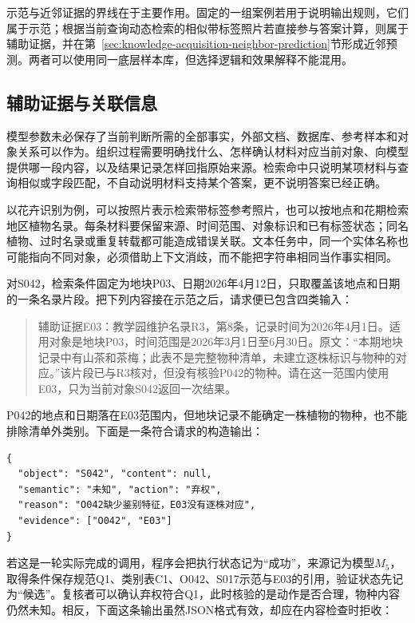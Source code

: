 示范与近邻证据的界线在于主要作用。固定的一组案例若用于说明输出规则，它们属于示范；根据当前查询动态检索的相似带标签照片若直接参与答案计算，则属于辅助证据，并在第~\ref{sec:knowledge-acquisition-neighbor-prediction}节形成近邻预测。两者可以使用同一底层样本库，但选择逻辑和效果解释不能混用。

\subsection{辅助证据与关联信息}
\label{sec:knowledge-acquisition-auxiliary-evidence}

模型参数未必保存了当前判断所需的全部事实，外部文档、数据库、参考样本和对象关系可以作为。组织过程需要明确找什么、怎样确认材料对应当前对象、向模型提供哪一段内容，以及结果记录怎样回指原始来源。检索命中只说明某项材料与查询相似或字段匹配，不自动说明材料支持某个答案，更不说明答案已经正确。

以花卉识别为例，可以按照片表示检索带标签参考照片，也可以按地点和花期检索地区植物名录。每条材料要保留来源、时间范围、对象标识和已有标签状态；同名植物、过时名录或重复转载都可能造成错误关联。文本任务中，同一个实体名称也可能指向不同对象，必须借助上下文消歧，而不能把字符串相同当作事实相同。

对S042，检索条件固定为地块P03、日期2026年4月12日，只取覆盖该地点和日期的一条名录片段。把下列内容接在示范之后，请求便已包含四类输入：

\begin{quote}
  辅助证据E03：教学园维护名录R3，第8条，记录时间为2026年4月1日。适用对象是地块P03，时间范围是2026年3月1日至6月30日。原文：“本期地块记录中有山茶和茶梅；此表不是完整物种清单，未建立逐株标识与物种的对应。”该片段已与R3核对，但没有核验P042的物种。请在这一范围内使用E03，只为当前对象S042返回一次结果。
\end{quote}

P042的地点和日期落在E03范围内，但地块记录不能确定一株植物的物种，也不能排除清单外类别。下面是一条符合请求的构造输出：

\begin{lstlisting}[style=book code,numbers=none]
{
  "object": "S042", "content": null,
  "semantic": "未知", "action": "弃权",
  "reason": "O042缺少鉴别特征，E03没有逐株对应",
  "evidence": ["O042", "E03"]
}
\end{lstlisting}

若这是一轮实际完成的调用，程序会把执行状态记为“成功”，来源记为模型$M_5$，取得条件保存规范Q1、类别表C1、O042、S017示范与E03的引用，验证状态先记为“候选”。复核者可以确认弃权符合Q1，此时核验的是动作是否合理，物种内容仍然未知。相反，下面这条输出虽然JSON格式有效，却应在内容检查时拒收：

